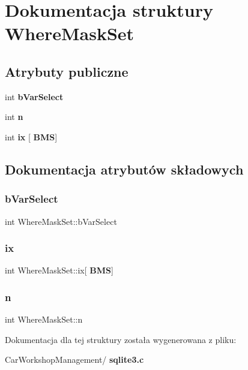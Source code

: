 \section{Dokumentacja struktury Where\+Mask\+Set}
\label{struct_where_mask_set}
\subsection*{Atrybuty publiczne}
\begin{DoxyCompactItemize}
\item 
int \textbf{ b\+Var\+Select}
\item 
int \textbf{ n}
\item 
int \textbf{ ix} [\textbf{ B\+MS}]
\end{DoxyCompactItemize}


\subsection{Dokumentacja atrybutów składowych}
\mbox{\label{struct_where_mask_set_a04925644819000d2cfad8afee6f57d61}} 
\subsubsection{bVarSelect}
{\footnotesize\ttfamily int Where\+Mask\+Set\+::b\+Var\+Select}

\mbox{\label{struct_where_mask_set_a9de4e7b27d4f793f37c1ead7b44ecb48}} 
\subsubsection{ix}
{\footnotesize\ttfamily int Where\+Mask\+Set\+::ix[\textbf{ B\+MS}]}

\mbox{\label{struct_where_mask_set_a09923e1dee2157c78c5ae0df65e8ee7c}} 
\subsubsection{n}
{\footnotesize\ttfamily int Where\+Mask\+Set\+::n}



Dokumentacja dla tej struktury została wygenerowana z pliku\+:\begin{DoxyCompactItemize}
\item 
Car\+Workshop\+Management/\textbf{ sqlite3.\+c}\end{DoxyCompactItemize}
